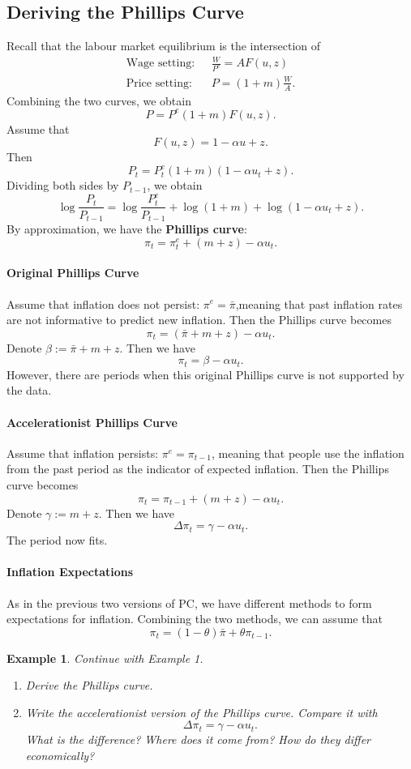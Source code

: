 \documentclass[12pt]{article}
\newtheorem{example}{Example}
\begin{document}
\subsection*{Deriving the Phillips Curve}
Recall that the labour market equilibrium is the intersection of
\begin{align*}
    \text{Wage setting: }\,\,&\frac{W}{P^e} = AF(u,z)\\
    \text{Price setting: }\,\,&P = (1+m)\frac{W}{A}.
\end{align*}
Combining the two curves, we obtain
\[P = P^e(1+m) F(u,z).\]
Assume that
\[F(u,z) = 1-\alpha u +z.\]
Then
\[P_t = P^e_t(1+m) (1-\alpha u_t +z).\]
Dividing both sides by $P_{t-1}$, we obtain
\[\log\frac{P_t}{P_{t-1}} = \log\frac{P^e_t}{P_{t-1}} + \log (1+m) + \log (1-\alpha u_t +z).\]
By approximation, we have the \textbf{Phillips curve}:
\[\pi_t = \pi^e_t + (m+z) - \alpha u_t.\]

\paragraph{Original Phillips Curve}
Assume that inflation does not persist: $\pi^e = \bar{\pi}$,meaning that past inflation rates are not informative to predict new inflation. Then the Phillips curve becomes
\[\pi_t = (\bar{\pi}+m+z) - \alpha u_t.\]
Denote $\beta := \bar{\pi}+m+z$. Then we have
\[\pi_t = \beta - \alpha u_t.\]
However, there are periods when this original Phillips curve is not supported by the data.

\paragraph{Accelerationist Phillips Curve}
Assume that inflation persists: $\pi^e = \pi_{t-1}$, meaning that people use the inflation from the past period as the indicator of expected inflation. Then the Phillips curve becomes
\[\pi_t = \pi_{t-1} + (m+z) - \alpha u_t.\]
Denote $\gamma := m+z$. Then we have
\[\Delta \pi_t = \gamma - \alpha u_t.\]
The period now fits.

\paragraph{Inflation Expectations}
As in the previous two versions of PC, we have different methods to form expectations for inflation. Combining the two methods, we can assume that
\[\pi_t = (1-\theta)\bar{\pi} + \theta\pi_{t-1}.\]

\begin{example}
    Continue with Example 1.
    \begin{enumerate}[label=(\arabic*)]
        \item Derive the Phillips curve.
        \vspace{60pt}
        \item Write the accelerationist version of the Phillips curve. Compare it with
        \[\Delta \pi_t = \gamma - \alpha u_t.\]
        What is the difference? Where does it come from? How do they differ economically?
        \vspace{60pt}
    \end{enumerate}
\end{example}
\end{document}

